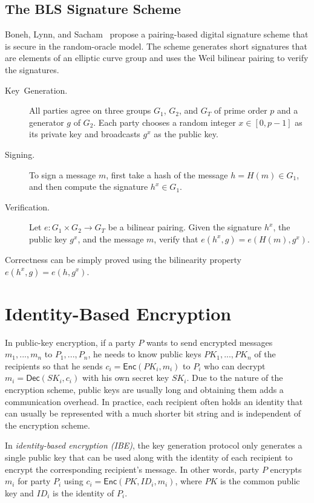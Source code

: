 \documentclass[10pt]{article}
\theoremstyle{plain}
\begin{document}
\subsection{The BLS Signature Scheme}

Boneh, Lynn, and Sacham~\cite{Boneh:2001:SSW:647097.717005} propose
a pairing-based\emph{ }digital signature scheme that is secure in
the random-oracle model. The scheme generates short signatures that
are elements of an elliptic curve group and uses the Weil bilinear
pairing to verify the signatures.
\begin{description}
	\item [{Key~Generation.}] All parties agree on three groups $G_{1}$,
	$G_{2}$, and $G_{T}$ of prime order $p$ and a generator $g$ of
	$G_{2}$. Each party chooses a random integer $x\in[0,p-1]$ as its
	private key and broadcasts $g^{x}$ as the public key.
	\item [{Signing.}] To sign a message $m$, first take a hash of the message
	$h=H(m)\in G_{1}$, and then compute the signature $h^{x}\in G_{1}$.
	\item [{Verification.}] Let $e:G_{1}\times G_{2}\to G_{T}$ be a bilinear
	pairing. Given the signature $h^{x}$, the public key $g^{x}$, and
	the message $m$, verify that $e(h^{x},g)=e(H(m),g^{x})$.
\end{description}
Correctness can be simply proved using the bilinearity property $e(h^{x},g)=e(h,g^{x})$.

\section{Identity-Based Encryption}

In public-key encryption, if a party $P$ wants to send encrypted
messages $m_{1},...,m_{n}$ to $P_{1},...,P_{n}$, he needs to know
public keys $PK_{1},...,PK_{n}$ of the recipients so that he sends
$c_{i}=\mathsf{Enc}(PK_{i},m_{i})$ to $P_{i}$ who can decrypt $m_{i}=\mathsf{Dec}(SK_{i},c_{i})$
with his own secret key $SK_{i}$. Due to the nature of the encryption
scheme, public keys are usually long and obtaining them adds a communication
overhead. In practice, each recipient often holds an identity that
can usually be represented with a much shorter bit string and is independent
of the encryption scheme.

In \emph{identity-based encryption (IBE)}, the key generation protocol
only generates a single public key that can be used along with the
identity of each recipient to encrypt the corresponding recipient's
message. In other words, party $P$ encrypts $m_{i}$ for party $P_{i}$
using $c_{i}=\mathsf{Enc}(PK,ID_{i},m_{i})$, where $PK$ is the common
public key and $ID_{i}$ is the identity of $P_{i}$.
\end{document}
